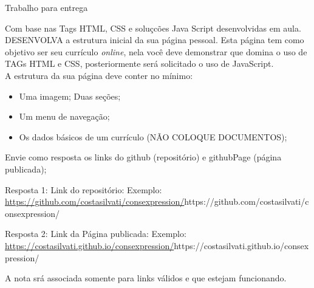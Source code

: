 \documentclass{beamer}
\begin{document}
\begin{frame}{Trabalho para entrega}
\small{
    Com base nas Tags HTML, CSS e soluçcões Java Script desenvolvidas em aula. DESENVOLVA a estrutura inicial da sua página pessoal. Esta página tem como objetivo ser seu currículo \textit{online}, nela você deve demonstrar que domina o uso de TAGs HTML e CSS, posteriormente será solicitado o uso de JavaScript.\\

A estrutura da sua página deve conter no mínimo:\\
\begin{itemize}
    \item Uma imagem;
    \ietm Duas seções;
    \item Um menu de navegação;
    \item Os dados básicos de um currículo (NÃO COLOQUE DOCUMENTOS);
\end{itemize}

Envie como resposta os links do github (repositório) e githubPage (página publicada);

Resposta 1: Link do repositório:
    Exemplo: \url{https://github.com/costasilvati/consexpression/}{https://github.com/costasilvati/consexpression/}

Resposta 2: Link da Página publicada:
    Exemplo:  \url{https://costasilvati.github.io/consexpression/}{https://costasilvati.github.io/consexpression/}

A nota srá associada somente para links válidos e que estejam funcionando.}
\end{frame}
\end{document}
